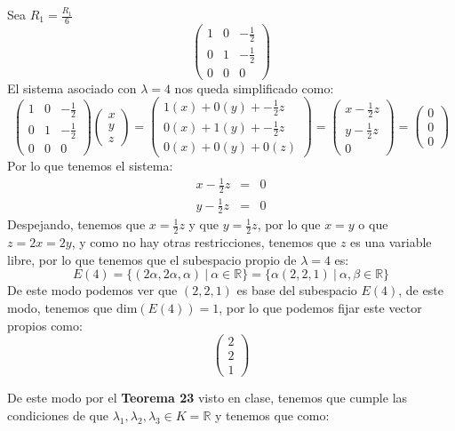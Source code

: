 \begin{itemize}
\begin{itemize}
    Sea $R_1=\frac{R_1}{6}$
    $$\begin{pmatrix}1&0&-\frac{1}{2}\\ 0&1&-\frac{1}{2}\\ 0&0&0\end{pmatrix}$$
    El sistema asociado con $\lambda=4$ nos queda simplificado como:
    $$\begin{pmatrix}1&0&-\frac{1}{2}\\ 0&1&-\frac{1}{2}\\ 0&0&0\end{pmatrix}\begin{pmatrix}x\\ y\\ z\end{pmatrix}=\begin{pmatrix}1(x)+0(y)+-\frac{1}{2}z\\ 0(x)+1(y)+-\frac{1}{2}z\\0(x)+0(y)+0(z)\end{pmatrix}=\begin{pmatrix}x-\frac{1}{2}z\\ y-\frac{1}{2}z\\ 0\end{pmatrix}=\begin{pmatrix}0\\ 0\\ 0\end{pmatrix}$$
    Por lo que tenemos el sistema:
    \begin{eqnarray*}
    x-\frac{1}{2}z&=&0\\
    y-\frac{1}{2}z&=&0
    \end{eqnarray*}
    Despejando, tenemos que $x=\frac{1}{2}z$ y que $y=\frac{1}{2}z$, por lo que $x=y$ o que $z=2x=2y$, y como no hay otras restricciones, tenemos que $z$ es una variable libre, por lo que tenemos que el subespacio propio de $\lambda=4$ es:
    \[E(4)=\{(2\alpha,2\alpha,\alpha)~|~\alpha\in\mathbb{R}\}=\{\alpha(2,2,1)~|~\alpha,\beta\in\mathbb{R}\}\]
    De este modo podemos ver que $(2,2,1)$ es base del subespacio $E(4)$, de este modo, tenemos que $\text{dim}(E(4))=1$, por lo que podemos fijar este vector propios como:
    $$\begin{pmatrix}2\\ 2\\ 1\end{pmatrix}$$
    \end{itemize}
    De este modo por el \textbf{Teorema 23} visto en clase, tenemos que cumple las condiciones de que $\lambda_1,\lambda_2,\lambda_3\in K=\mathbb{R}$ y tenemos que como:

\end{itemize}
